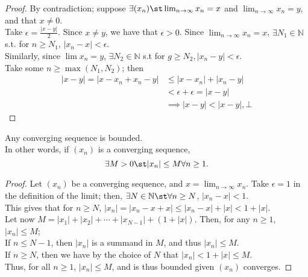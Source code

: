 \documentclass[12pt]{article}
\begin{document}
\begin{proof}
  By contradiction; suppose $\exists (x_n) \st \lim_{n \to \infty} x_n = x$ and $\lim_{n \to \infty} x_n = y$, and that $x \neq 0$.\\
  Take $\epsilon = \frac{|x-y|}{2}$. Since $x \neq y$, we have that $\epsilon > 0$. Since $\lim_{n \to \infty} x_n = x$, $\exists N_1 \in \mathbb{N}$ s.t. for $n \geq N_1$, $|x_n - x| < \epsilon$. \\
  Similarly,  since $\lim x_n = y$, $\exists N_2 \in \mathbb{N}$ s.t for $g \geq N_2, |x_n - y| < \epsilon$. \\
  Take some $n \geq \max(N_1, N_2)$; then \begin{align*}
    |x-y| = |x-x_n + x_n - y| &\leq |x-x_n|+|x_n-y|\\
    &< \epsilon + \epsilon = |x-y|\\
    &\implies |x-y| < |x-y|, \bot
  \end{align*}
\end{proof}

\begin{theorem}\label{thm:convbound}
  Any converging sequence is bounded.\footnotemark\\In other words, if $(x_n)$ is a converging sequence, $$\exists M > 0 \st |x_n| \leq M \forall n \geq 1.$$
\end{theorem}



\begin{proof}
  Let $(x_n)$ be a converging sequence, and $x = \lim_{n\to\infty} x_n$. Take $\epsilon = 1$ in the definition of the limit; then, $\exists N \in \mathbb{N} \st \forall n \geq N$, $|x_n - x| < 1$.\\
  This gives that for $n \geq N$, $|x_n| = |x_n - x + x| \leq |x_n - x| + |x| < 1 + |x|$.\\
  Let now $M = |x_1| + |x_2| + \cdots + |x_{N-1}| + (1 + |x|)$. Then, for any $n \geq 1$, $|x_n| \leq M$;\\If $n \leq N-1$, then $|x_n|$ is a summand in $M$, and thus $|x_n| \leq M$.\\ If $n \geq N$, then we have by the choice of $N$ that $|x_n| < 1 + |x| \leq M$.\\ Thus, for all $n \geq 1$, $|x_n| \leq M$, and is thus bounded given $(x_n)$ converges.
\end{proof}
\end{document}
